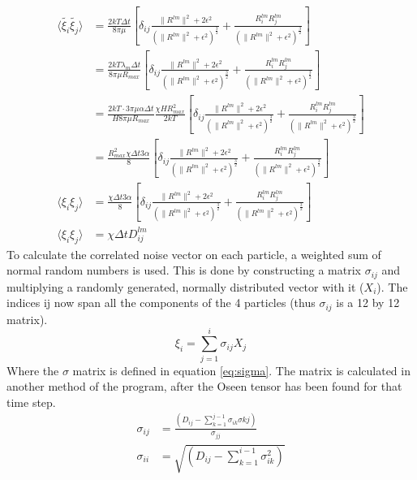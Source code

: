 \documentclass{article}
\begin{document}
\begin{align}
    \langle \tilde{\xi_i} \tilde{\xi_j}\rangle &= \frac{2 kT \Delta t}{8 \pi \mu } \left[ \delta_{ij} \frac{\|R^{lm}\|^2 + 2\epsilon^2}{(\|R^{lm}\|^2 + \epsilon ^2)^\frac{3}{2}} + \frac{R_i^{lm}R_j^{lm}}{(\|R^{lm}\|^2 + \epsilon ^2)^\frac{3}{2}} \right] \label{eq:noisecorrelation} \\
    &= \frac{2 kT \lambda_m {\Delta t}}{8 \pi \mu R_{max}} \left[ \delta_{ij} \frac{\|{R^{lm}}\|^2 + 2\epsilon^2}{(\|{R^{lm}}\|^2 + \epsilon ^2)^\frac{3}{2}} + \frac{{R_i^{lm}} {R_j^{lm}}} {(\|{R^{lm}}\|^2 + \epsilon ^2)^\frac{3}{2}} \right] \\
    &=  \frac{2 kT \cdot 3 \pi \mu \alpha {\Delta t}}{H 8 \pi \mu R_{max}} \frac{\chi H R^2_{max}}{2kT} \left[ \delta_{ij} \frac{\|{R^{lm}}\|^2 + 2\epsilon^2}{(\|{R^{lm}}\|^2 + \epsilon ^2)^\frac{3}{2}} + \frac{{R_i^{lm}} {R_j^{lm}}} {(\|{R^{lm}}\|^2 + \epsilon ^2)^\frac{3}{2}} \right] \\
    &=  \frac{   R^2_{max} \chi   {\Delta t} 3{\alpha}}{ 8 } \left[ \delta_{ij} \frac{\|{R^{lm}}\|^2 + 2\epsilon^2}{(\|{R^{lm}}\|^2 + \epsilon ^2)^\frac{3}{2}} + \frac{{R_i^{lm}} {R_j^{lm}}} {(\|{R^{lm}}\|^2 + \epsilon ^2)^\frac{3}{2}} \right] \\
    \langle {\xi_i} {\xi_j}\rangle &= \frac{ \chi   {\Delta t} 3{\alpha}}{ 8 } \left[ \delta_{ij} \frac{\|{R^{lm}}\|^2 + 2\epsilon^2}{(\|{R^{lm}}\|^2 + \epsilon ^2)^\frac{3}{2}} + \frac{{R_i^{lm}} {R_j^{lm}}} {(\|{R^{lm}}\|^2 + \epsilon ^2)^\frac{3}{2}} \right] \\
    \langle {\xi_i} {\xi_j}\rangle &= \chi   {\Delta t} {D_{ij}^{lm}}
\end{align}
To calculate the correlated noise vector on each particle, a weighted sum of normal random numbers is used. This is done by constructing a matrix $\sigma_{ij}$ and multiplying a randomly generated, normally distributed vector with it ($X_i$). The indices ij now span all the components of the 4 particles (thus $\sigma_{ij}$ is a 12 by 12 matrix).
\begin{equation}
    \xi_{i}     = \sum_{j =1}^{i} \sigma_{ij} X_{j}
\end{equation}
Where the $\sigma $ matrix is defined in equation \eqref{eq:sigma}. The matrix is calculated in another method of the program, after the Oseen tensor has been found for that time step. 
\begin{align}\label{eq:sigma}
    \sigma_{ij} &= \frac{\left( {D_{ij}} - \sum_{k = 1}^{j-1}\sigma_{ik}\sigma{kj} \right)}{\sigma_{jj}} \\
    \sigma_{ii} &= \sqrt{ \left( {D_{ij}} - \sum_{k = 1}^{i-1}\sigma_{ik}^{2} \right)}
\end{align}
\end{document}
